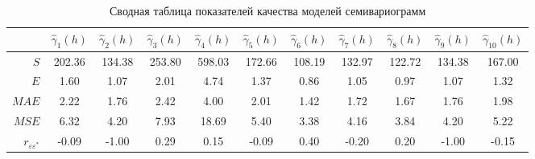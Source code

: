 \begin{table}[ht]
\centering
{\footnotesize
\begin{tabular}{r|cccccccccc}
  \hline
 & $ \widehat{\gamma}_1(h) $ & $ \widehat{\gamma}_2(h) $ & $ \widehat{\gamma}_3(h) $ & $ \widehat{\gamma}_4(h) $ & $ \widehat{\gamma}_5(h) $ & $ \widehat{\gamma}_6(h) $ & $ \widehat{\gamma}_7(h) $ & $ \widehat{\gamma}_8(h) $ & $ \widehat{\gamma}_9(h) $ & $ \widehat{\gamma}_{10}(h) $ \\ 
  \hline
$ S $ & 202.36 & 134.38 & 253.80 & 598.03 & 172.66 & 108.19 & 132.97 & 122.72 & 134.38 & 167.00 \\ 
  $ E $ & 1.60 & 1.07 & 2.01 & 4.74 & 1.37 & 0.86 & 1.05 & 0.97 & 1.07 & 1.32 \\ 
  $ MAE $ & 2.22 & 1.76 & 2.42 & 4.00 & 2.01 & 1.42 & 1.72 & 1.67 & 1.76 & 1.98 \\ 
  $ MSE $ & 6.32 & 4.20 & 7.93 & 18.69 & 5.40 & 3.38 & 4.16 & 3.84 & 4.20 & 5.22 \\ 
  $ r_{\varepsilon\varepsilon^{*}} $ & -0.09 & -1.00 & 0.29 & 0.15 & -0.09 & 0.40 & -0.20 & 0.20 & -1.00 & -0.15 \\ 
   \hline
\end{tabular}
}
\caption{Сводная таблица показателей качества моделей семивариограмм} 
\label{table:summary-cv}
\end{table}
